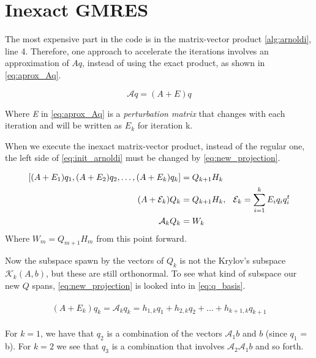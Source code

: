 \section{Inexact GMRES}

The most expensive part in the code is in the matrix-vector product \ref{alg:arnoldi}, line 4. Therefore, one approach to accelerate the iterations involves an approximation of $Aq $, instead of using the exact product, as shown in \ref{eq:aprox_Aq}.

\begin{equation}\label{eq:aprox_Aq}
    \mathcal{A}q = (A + E)q
\end{equation}

Where \textit{E} in \ref{eq:aprox_Aq} is a \textit{perturbation matrix} that changes with each iteration and will be written as $E_{k}$ for iteration k.

When we execute the inexact matrix-vector product, instead of the regular one, the left side of \ref{eq:init_arnoldi} must be changed by \ref{eq:new_projection}.


\begin{align} \label{eq:new_projection}
    \begin{split}
        [(A + E_{1})q_{1}, (A + E_{2})q_{2},\dots, (A + E_{k})q_{k}] &= Q_{k+1}H_{k}\\
        (A + \mathcal{E}_{k})Q_{k} &= Q_{k+1}H_{k}, \hspace{0.1in} \mathcal{E}_{k} = \sum_{i=1}^{k}E_{i}q_{i}q_{i}^{t}\\
        \mathcal{A}_{k}Q_{k} &= W_{k}
    \end{split}
\end{align}
Where $W_{m} = Q_{m+1}H_{m}$ from this point forward.

Now the subspace spawn by the vectors of $Q_{k}$ is not the Krylov's subspace $\mathcal{K}_{k}(A,b)$, but these are still orthonormal.  To see what kind of subspace our new $Q$ spans, \ref{eq:new_projection} is looked into in \ref{eq:q_basis}.

\begin{align}\label{eq:q_basis}
    \begin{split}
        (A + E_{k})q_{k}=\mathcal{A}_{k} q_{k} = h_{1,k}q_{1} + h_{2,k}q_{2} + \dots + h_{k+1,k}q_{k+1}
    \end{split}
\end{align}

For $k=1$, we have that $q_{2}$ is a combination of the vectors $\mathcal{A}_{1}b$ and $b$ (since $q_{1}$ = b). For $k=2$ we see that $q_{3}$ is a combination that involves $\mathcal{A}_{2} \mathcal{A}_{1}b$ and so forth.

